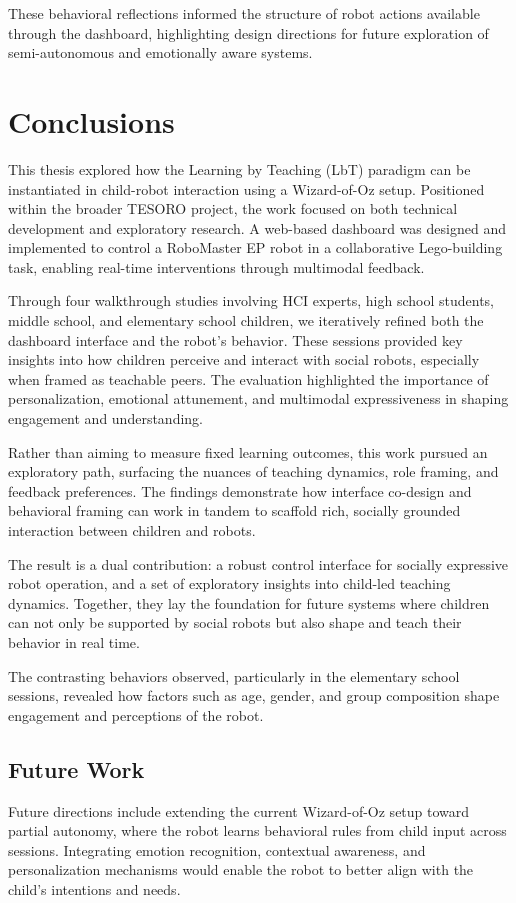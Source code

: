\documentclass[a4paper]{usiinfbachelorproject}
\begin{document}
These behavioral reflections informed the structure of robot actions available through the dashboard, highlighting design directions for future exploration of semi-autonomous and emotionally aware systems.

\newpage

\section{\textbf{Conclusions}}\label{sec:conclusions}
This thesis explored how the Learning by Teaching (LbT) paradigm can be instantiated in child-robot interaction using a Wizard-of-Oz setup.
Positioned within the broader TESORO project, the work focused on both technical development and exploratory research.
A web-based dashboard was designed and implemented to control a RoboMaster EP robot in a collaborative Lego-building task, enabling real-time interventions through multimodal feedback.

Through four walkthrough studies involving HCI experts, high school students, middle school, and elementary school children, we iteratively refined both the dashboard interface and the robot's behavior.
These sessions provided key insights into how children perceive and interact with social robots, especially when framed as teachable peers.
The evaluation highlighted the importance of personalization, emotional attunement, and multimodal expressiveness in shaping engagement and understanding.

Rather than aiming to measure fixed learning outcomes, this work pursued an exploratory path, surfacing the nuances of teaching dynamics, role framing, and feedback preferences.
The findings demonstrate how interface co-design and behavioral framing can work in tandem to scaffold rich, socially grounded interaction between children and robots.

The result is a dual contribution: a robust control interface for socially expressive robot operation, and a set of exploratory insights into child-led teaching dynamics.
Together, they lay the foundation for future systems where children can not only be supported by social robots but also shape and teach their behavior in real time.

The contrasting behaviors observed, particularly in the elementary school sessions, revealed how factors such as age, gender, and group composition shape engagement and perceptions of the robot.

\subsection{\textbf{Future Work}}
Future directions include extending the current Wizard-of-Oz setup toward partial autonomy, where the robot learns behavioral rules from child input across sessions.
Integrating emotion recognition, contextual awareness, and personalization mechanisms would enable the robot to better align with the child's intentions and needs.
\end{document}
